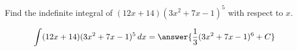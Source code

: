 \documentclass{ximera}
\author{Gregory Hartman \and Matthew Carr}
\begin{document}
\begin{exercise}


Find the indefinite integral of $(12 x+14)(3 x^2+7 x-1)^5$ with respect to $x$.

\[
\int (12 x+14)(3 x^2+7 x-1)^5 \d x=\answer{\frac{1}{3} (3x^2+7x-1)^6+C}
\]


\end{exercise}
\end{document}

